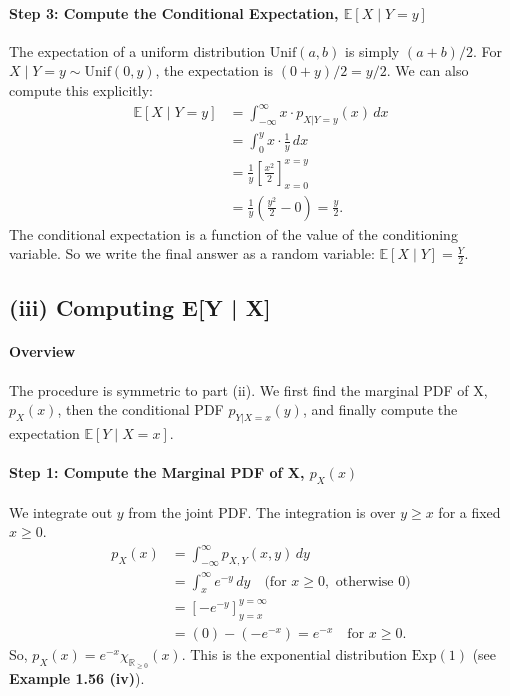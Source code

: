 \documentclass[11pt,a4paper]{article}
\begin{document}
\paragraph{Step 3: Compute the Conditional Expectation, $\mathbb{E}[X \mid Y=y]$}
The expectation of a uniform distribution $\text{Unif}(a,b)$ is simply $(a+b)/2$. For $X \mid Y=y \sim \text{Unif}(0,y)$, the expectation is $(0+y)/2 = y/2$. We can also compute this explicitly:
\begin{align*}
    \mathbb{E}[X \mid Y=y] &= \int_{-\infty}^{\infty} x \cdot p_{X|Y=y}(x) \,dx \\
    &= \int_{0}^{y} x \cdot \frac{1}{y} \,dx \\
    &= \frac{1}{y} \left[ \frac{x^2}{2} \right]_{x=0}^{x=y} \\
    &= \frac{1}{y} \left( \frac{y^2}{2} - 0 \right) = \frac{y}{2}.
\end{align*}
The conditional expectation is a function of the value of the conditioning variable. So we write the final answer as a random variable: $\mathbb{E}[X \mid Y] = \frac{Y}{2}$.

\subsection{(iii) Computing E[Y | X]}

\paragraph{Overview}
The procedure is symmetric to part (ii). We first find the marginal PDF of X, $p_X(x)$, then the conditional PDF $p_{Y|X=x}(y)$, and finally compute the expectation $\mathbb{E}[Y \mid X=x]$.

\paragraph{Step 1: Compute the Marginal PDF of X, $p_X(x)$}
We integrate out $y$ from the joint PDF. The integration is over $y \ge x$ for a fixed $x \ge 0$.
\begin{align*}
    p_X(x) &= \int_{-\infty}^{\infty} p_{X,Y}(x,y) \,dy \\
    &= \int_{x}^{\infty} e^{-y} \,dy \quad \text{(for } x \ge 0, \text{ otherwise 0)} \\
    &= \left[ -e^{-y} \right]_{y=x}^{y=\infty} \\
    &= (0) - (-e^{-x}) = e^{-x} \quad \text{for } x \ge 0.
\end{align*}
So, $p_X(x) = e^{-x} \chi_{\mathbb{R}_{\ge 0}}(x)$. This is the exponential distribution $\text{Exp}(1)$ (see \textbf{Example 1.56 (iv)}).
\end{document}
